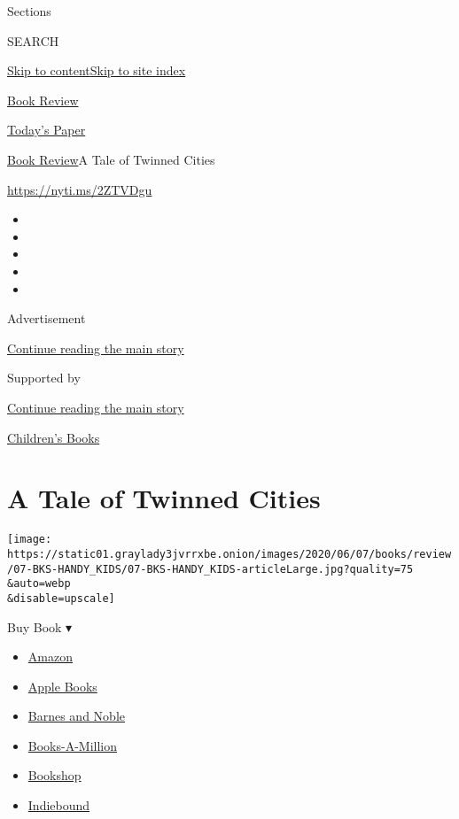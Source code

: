 Sections

SEARCH

\protect\hyperlink{site-content}{Skip to
content}\protect\hyperlink{site-index}{Skip to site index}

\href{https://www.nytimes3xbfgragh.onion/section/books/review}{Book
Review}

\href{https://myaccount.nytimes3xbfgragh.onion/auth/login?response_type=cookie\&client_id=vi}{}

\href{https://www.nytimes3xbfgragh.onion/section/todayspaper}{Today's
Paper}

\href{/section/books/review}{Book Review}\textbar{}A Tale of Twinned
Cities

\url{https://nyti.ms/2ZTVDgu}

\begin{itemize}
\item
\item
\item
\item
\item
\end{itemize}

Advertisement

\protect\hyperlink{after-top}{Continue reading the main story}

Supported by

\protect\hyperlink{after-sponsor}{Continue reading the main story}

\href{/column/childrens-books}{Children's Books}

\hypertarget{a-tale-of-twinned-cities}{%
\section{A Tale of Twinned Cities}\label{a-tale-of-twinned-cities}}

\texttt{[image: https://static01.graylady3jvrrxbe.onion/images/2020/06/07/books/review/07-BKS-HANDY\_KIDS/07-BKS-HANDY\_KIDS-articleLarge.jpg?quality=75\\\&auto=webp\\\&disable=upscale]}

Buy Book ▾

\begin{itemize}
\tightlist
\item
  \href{https://www.amazon.com/gp/search?index=books\&tag=NYTBSREV-20\&field-keywords=Thieves+of+Weirdwood+William+Shivering}{Amazon}
\item
  \href{https://du-gae-books-dot-nyt-du-prd.appspot.com/buy?title=Thieves+of+Weirdwood\&author=William+Shivering}{Apple
  Books}
\item
  \href{https://www.anrdoezrs.net/click-7990613-11819508?url=https\%3A\%2F\%2Fwww.barnesandnoble.com\%2Fw\%2F\%3Fean\%3D9781250302885}{Barnes
  and Noble}
\item
  \href{https://www.anrdoezrs.net/click-7990613-35140?url=https\%3A\%2F\%2Fwww.booksamillion.com\%2Fp\%2FThieves\%2Bof\%2BWeirdwood\%2FWilliam\%2BShivering\%2F9781250302885}{Books-A-Million}
\item
  \href{https://bookshop.org/a/3546/9781250302885}{Bookshop}
\item
  \href{https://www.indiebound.org/book/9781250302885?aff=NYT}{Indiebound}
\end{itemize}

